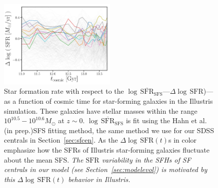 \documentclass[12pt, letterpaper, preprint]{aastex}
\newcommand{\logsfr}{\log \, \mathrm{SFR}}
\newcommand{\musfms}{\log\,\overline{\mathrm{SFR}}_\mathrm{SFS}}
\newcommand{\hahngmm}{Hahn et al. (in prep.)}
\begin{document}
\begin{figure}
\begin{center}
\includegraphics[width=0.5\textwidth]{figs/illustris_sfh.pdf} 
    \caption{Star formation rate with respect to the $\musfms$---$\Delta \logsfr$)---as 
    a function of cosmic time for star-forming galaxies in the Illustris simulation. 
    These galaxies have stellar masses within the range $10^{10.5}-10^{10.6}M_\odot$ 
    at $z\sim0$. $\musfms$ is fit using the \hahngmm SFS fitting method, the same method
    we use for our SDSS centrals in Section~\ref{sec:sfcen}. As the $\Delta \logsfr(t)$s
    in color emphasize how the SFRs of Illustris star-forming galaxies fluctuate about 
    the mean SFS. \emph{The $\mathrm{SFR}$ variability in the SFHs of SF centrals in our model (see 
    Section~\ref{sec:modelevol}) is motivated by this $\Delta \logsfr(t)$ behavior in 
    Illustris.}}
\label{fig:illsfh}
\end{center}
\end{figure}
\end{document}
